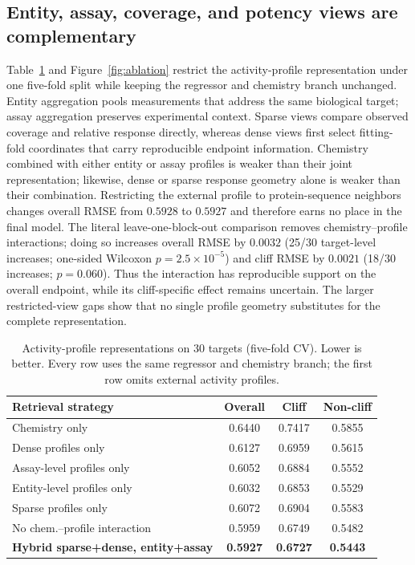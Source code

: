 \documentclass[manuscript,nonacm]{acmart}
\begin{document}
\subsection{Entity, assay, coverage, and potency views are complementary}
Table~\ref{tab:ablation} and Figure~\ref{fig:ablation} restrict the
activity-profile representation under one five-fold split while keeping the
regressor and chemistry branch unchanged. Entity aggregation pools measurements
that address the same biological target; assay aggregation preserves
experimental context. Sparse views compare observed coverage and relative
response directly, whereas dense views first select fitting-fold coordinates
that carry reproducible endpoint information. Chemistry combined with either
entity or assay profiles is weaker than their joint representation; likewise,
dense or sparse response geometry alone is weaker than their combination.
Restricting the external profile to protein-sequence neighbors changes overall
RMSE from $0.5928$ to $0.5927$ and therefore earns no place in the final model.
The literal leave-one-block-out comparison removes chemistry--profile
interactions; doing so
increases overall RMSE by $0.0032$ (25/30 target-level increases; one-sided
Wilcoxon $p=2.5\times10^{-5}$) and cliff RMSE by $0.0021$ (18/30 increases;
$p=0.060$). Thus the interaction has reproducible support on the overall
endpoint, while its cliff-specific effect remains uncertain. The larger
restricted-view gaps show that no single profile geometry substitutes for
the complete representation.

\begin{table}[t]
\centering
\caption{Activity-profile representations on 30 targets (five-fold CV). Lower
is better. Every row uses the same regressor and chemistry branch; the first
row omits external activity profiles.}
\label{tab:ablation}
\footnotesize
\begin{tabular}{lccc}
\toprule
Retrieval strategy & Overall & Cliff & Non-cliff\\
\midrule
Chemistry only & 0.6440 & 0.7417 & 0.5855\\
Dense profiles only & 0.6127 & 0.6959 & 0.5615\\
Assay-level profiles only & 0.6052 & 0.6884 & 0.5552\\
Entity-level profiles only & 0.6032 & 0.6853 & 0.5529\\
Sparse profiles only & 0.6072 & 0.6904 & 0.5583\\
No chem.--profile interaction & 0.5959 & 0.6749 & 0.5482\\
\textbf{Hybrid sparse+dense, entity+assay} & \textbf{0.5927} & \textbf{0.6727} & \textbf{0.5443}\\
\bottomrule
\end{tabular}
\end{table}
\end{document}
